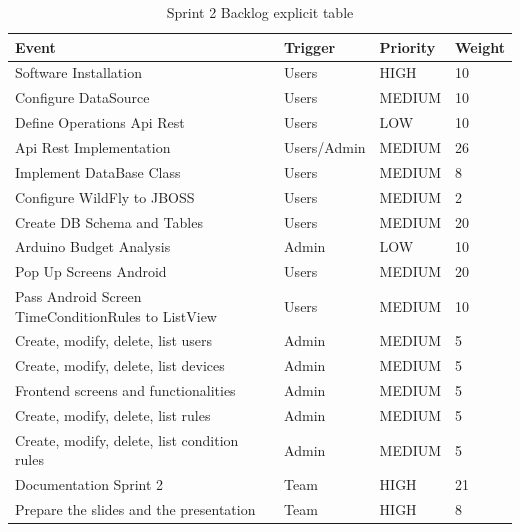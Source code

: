 \documentclass[11pt,a4paper]{article}
\begin{document}
\begin{table}[htbp]
\begin{tabular}{|l|l|l|l|} 
\hline
Event                                                & Trigger     & Priority & Weight \\ \hline \hline
Software Installation                                & Users       & HIGH     & 10     \\ \hline
Configure DataSource                                 & Users       & MEDIUM   & 10     \\ \hline
Define Operations Api Rest                           & Users       & LOW      & 10     \\ \hline
Api Rest Implementation                              & Users/Admin & MEDIUM   & 26     \\ \hline
Implement DataBase Class                             & Users       & MEDIUM   & 8      \\ \hline
Configure WildFly to JBOSS                           & Users       & MEDIUM   & 2      \\ \hline
Create DB Schema and Tables                          & Users       & MEDIUM   & 20     \\ \hline
Arduino Budget Analysis                              & Admin       & LOW      & 10     \\ \hline
Pop Up Screens Android                               & Users       & MEDIUM   & 20     \\ \hline
Pass Android Screen TimeConditionRules to ListView   & Users       & MEDIUM   & 10     \\ \hline
Create, modify, delete, list users                   & Admin       & MEDIUM   & 5      \\ \hline
Create, modify, delete, list devices                 & Admin       & MEDIUM   & 5      \\ \hline
Frontend screens and functionalities                 & Admin       & MEDIUM   & 5      \\ \hline
Create, modify, delete, list rules                   & Admin       & MEDIUM   & 5      \\ \hline
Create, modify, delete, list condition rules         & Admin       & MEDIUM   & 5      \\ \hline
Documentation Sprint 2                               & Team        & HIGH     & 21     \\ \hline
Prepare the slides and the presentation              & Team        & HIGH     & 8      \\ \hline
\end{tabular}
\caption{Sprint 2 Backlog explicit table}
\end{table}
\end{document}
